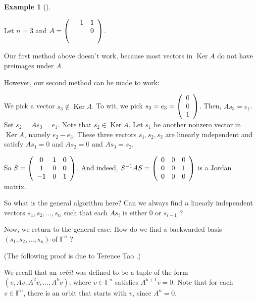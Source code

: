 \documentclass[numbers=enddot,12pt,final,onecolumn,notitlepage]{scrartcl}%
\numberwithin{exer}{subsection}
\theoremstyle{definition}
\newtheorem{exam}[theo]{Example}
\newenvironment{example}[1][]
{\begin{exam}[#1]\begin{leftbar}}
{\end{leftbar}\end{exam}}
\begin{document}
\begin{example}
Let $n=3$ and $A=\left(
\begin{array}
[c]{ccc}
& 1 & 1\\
&  & 0\\
&  &
\end{array}
\right)  $.

Our first method above doesn't work, because most vectors in
$\operatorname*{Ker}A$ do not have preimages under $A$.

However, our second method can be made to work:

We pick a vector $s_{3}\notin\operatorname*{Ker}A$. To wit, we pick
$s_{3}=e_{3}=\left(
\begin{array}
[c]{c}%
0\\
0\\
1
\end{array}
\right)  $. Then, $As_{3}=e_{1}$. Set $s_{2}=As_{3}=e_{1}$. Note that
$s_{2}\in\operatorname*{Ker}A$. Let $s_{1}$ be another nonzero vector in
$\operatorname*{Ker}A$, namely $e_{2}-e_{3}$.{} These three vectors
$s_{1},s_{2},s_{3}$ are linearly independent and satisfy $As_{1}=0$ and
$As_{2}=0$ and $As_{3}=s_{2}$.

So $S=\left(
\begin{array}
[c]{ccc}%
0 & 1 & 0\\
1 & 0 & 0\\
-1 & 0 & 1
\end{array}
\right)  $. And indeed, $S^{-1}AS=\allowbreak\left(
\begin{array}
[c]{ccc}%
0 & 0 & 0\\
0 & 0 & 1\\
0 & 0 & 0
\end{array}
\right)  $ is a Jordan matrix.
\end{example}

So what is the general algorithm here? Can we always find $n$ linearly
independent vectors $s_{1},s_{2},\ldots,s_{n}$ such that each $As_{i}$ is
either $0$ or $s_{i-1}$ ?

\bigskip

Now, we return to the general case: How do we find a backwarded basis $\left(
s_{1},s_{2},\ldots,s_{n}\right)  $ of $\mathbb{F}^{n}$ ?

(The following proof is due to Terence Tao \cite{Tao07}.)

We recall that an \emph{orbit} was defined to be a tuple of the form $\left(
v,Av,A^{2}v,\ldots,A^{k}v\right)  $, where $v\in\mathbb{F}^{n}$ satisfies
$A^{k+1}v=0$. Note that for each $v\in\mathbb{F}^{n}$, there is an orbit that
starts with $v$, since $A^{n}=0$.
\end{document}
